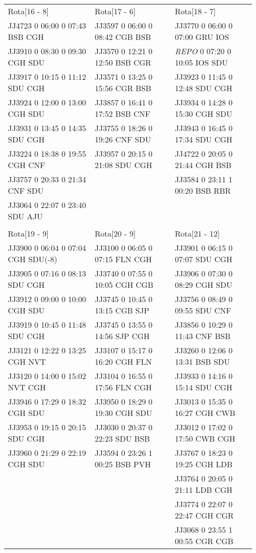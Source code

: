 \begin{scriptsize}
\begin{longtable}{l l l}
\\

Rota[16 - 8]  & Rota[17 - 6]  & Rota[18 - 7] \\
JJ4723 0 06:00 0 07:43 BSB CGH & JJ3597 0 06:00 0 08:42 CGB BSB & JJ3770 0 06:00 0 07:00 GRU IOS\\
JJ3910 0 08:30 0 09:30 CGH SDU & JJ3570 0 12:21 0 12:50 BSB CGR & \textit{REPO}  
0 07:20 0 10:05 IOS SDU\\ 
JJ3917 0 10:15 0 11:12 SDU CGH & JJ3571 0 13:25 0 15:56 CGR BSB & JJ3923 0 11:45 0 12:48 SDU CGH\\
JJ3924 0 12:00 0 13:00 CGH SDU & JJ3857 0 16:41 0 17:52 BSB CNF & JJ3934 0 14:28 0 15:30 CGH SDU\\
JJ3931 0 13:45 0 14:35 SDU CGH & JJ3755 0 18:26 0 19:26 CNF SDU & JJ3943 0 16:45 0 17:34 SDU CGH\\
JJ3224 0 18:38 0 19:55 CGH CNF & JJ3957 0 20:15 0 21:08 SDU CGH & JJ4722 0 20:05 0 21:44 CGH BSB\\
JJ3757 0 20:33 0 21:34 CNF SDU & & JJ3584 0 23:11 1 00:20 BSB RBR\\
JJ3064 0 22:07 0 23:40 SDU AJU\\

\\

Rota[19 - 9]  & Rota[20 - 9]  & Rota[21 - 12] \\
JJ3900 0 06:04 0 07:04 CGH SDU(-8) & JJ3100 0 06:05 0 07:15 FLN CGH & JJ3901 0
06:15 0 07:07 SDU CGH\\ 
JJ3905 0 07:16 0 08:13 SDU CGH & JJ3740 0 07:55 0 10:05 CGH CGB & JJ3906 0 07:30 0 08:29 CGH SDU\\
JJ3912 0 09:00 0 10:00 CGH SDU & JJ3745 0 10:45 0 13:15 CGB SJP & JJ3756 0 08:49 0 09:55 SDU CNF\\
JJ3919 0 10:45 0 11:48 SDU CGH & JJ3745 0 13:55 0 14:56 SJP CGH & JJ3856 0 10:29 0 11:43 CNF BSB\\
JJ3121 0 12:22 0 13:25 CGH NVT & JJ3107 0 15:17 0 16:20 CGH FLN & JJ3260 0 12:06 0 13:31 BSB SDU\\
JJ3120 0 14:00 0 15:02 NVT CGH & JJ3104 0 16:55 0 17:56 FLN CGH & JJ3933 0 14:16 0 15:14 SDU CGH\\
JJ3946 0 17:29 0 18:32 CGH SDU & JJ3950 0 18:29 0 19:30 CGH SDU & JJ3013 0 15:35 0 16:27 CGH CWB\\
JJ3953 0 19:15 0 20:15 SDU CGH & JJ3030 0 20:37 0 22:23 SDU BSB & JJ3012 0 17:02 0 17:50 CWB CGH\\
JJ3960 0 21:29 0 22:19 CGH SDU & JJ3594 0 23:26 1 00:25 BSB PVH & JJ3767 0 18:23 0 19:25 CGH LDB\\
 &  & JJ3764 0 20:05 0 21:11 LDB CGH\\
 &  & JJ3774 0 22:07 0 22:47 CGH CGR\\
 &  & JJ3068 0 23:55 1 00:55 CGR CGB\\


\end{longtable}
\end{scriptsize}
